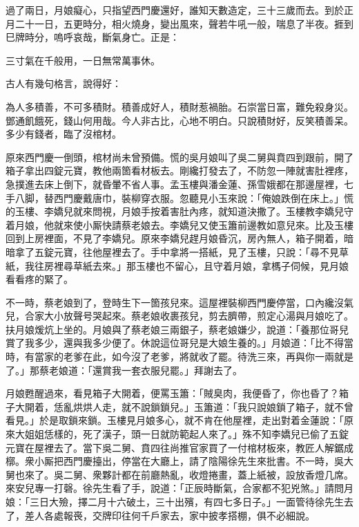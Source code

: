 過了兩日，月娘癡心，只指望西門慶還好，誰知天數造定，三十三歲而去。到於正月二十一日，五更時分，相火燒身，變出風來，聲若牛吼一般，喘息了半夜。捱到巳牌時分，嗚呼哀哉，斷氣身亡。正是：

三寸氣在千般用，一日無常萬事休。{}

古人有幾句格言，說得好：

\begin{myquote} 
為人多積善，不可多積財。積善成好人，積財惹禍胎。石崇當日富，難免殺身災。鄧通飢餓死，錢山何用哉。今人非古比，心地不明白。只說積財好，反笑積善呆。多少有錢者，臨了沒棺材。
\end{myquote} 

原來西門慶一倒頭，棺材尚未曾預備。慌的吳月娘叫了吳二舅與賁四到跟前，開了箱子拿出四錠元寶，教他兩箇看材板去。剛纔打發去了，不防忽一陣就害肚裡疼，急撲進去床上倒下，就昏暈不省人事。孟玉樓與潘金蓮、孫雪娥都在那邊屋裡，七手八脚，替西門慶戴唐巾，裝柳穿衣服。忽聽見小玉來說：「俺娘跌倒在床上。」慌的玉樓、李嬌兒就來問視，月娘手按着害肚內疼，就知道決撒了。玉樓教李嬌兒守着月娘，他就來使小厮快請蔡老娘去。李嬌兒又使玉簫前邊教如意兒來。比及玉樓回到上房裡面，不見了李嬌兒。原來李嬌兒趕月娘昏沉，房內無人，箱子開着，暗暗拿了五錠元寶，往他屋裡去了。手中拿將一搭紙，見了玉樓，只說：「尋不見草紙，我往房裡尋草紙去來。」那玉樓也不留心，且守着月娘，拿榪子伺候，見月娘看看疼的緊了。

不一時，蔡老娘到了，登時生下一箇孩兒來。這屋裡裝柳西門慶停當，口內纔沒氣兒，合家大小放聲号哭起來。蔡老娘收裹孩兒，剪去臍帶，煎定心湯與月娘吃了。扶月娘煖炕上坐的。月娘與了蔡老娘三兩銀子，蔡老娘嫌少，說道：「養那位哥兒賞了我多少，還與我多少便了。休說這位哥兒是大娘生養的。」月娘道：「比不得當時，有當家的老爹在此，如今沒了老爹，將就收了罷。待洗三來，再與你一兩就是了。」那蔡老娘道：「還賞我一套衣服兒罷。」拜謝去了。

月娘甦醒過來，看見箱子大開着，便罵玉簫：「賊臭肉，我便昏了，你也昏了？箱子大開着，恁亂烘烘人走，就不說鎖鎖兒。」玉簫道：「我只說娘鎖了箱子，就不曾看見。」於是取鎖來鎖。玉樓見月娘多心，就不肯在他屋裡，走出對着金蓮說：「原來大姐姐恁樣的，死了漢子，頭一日就防範起人來了。」殊不知李嬌兒已偷了五錠元寶在屋裡去了。當下吳二舅、賁四往尚推官家買了一付棺材板來，教匠人解鋸成槨。衆小厮把西門慶擡出，停當在大廳上，請了陰陽徐先生來批書。不一時，吳大舅也來了。吳二舅、衆夥計都在前廳熱亂，收燈捲畫，蓋上紙被，設放香燈几席。來安兒專一打磬。徐先生看了手，說道：「正辰時斷氣，合家都不犯兇煞。」請問月娘：「三日大殮，擇二月十六破土，三十出殯，有四七多日子。」一面管待徐先生去了，差人各處報䘮，交牌印往何千戶家去，家中披孝搭棚，俱不必細說。

